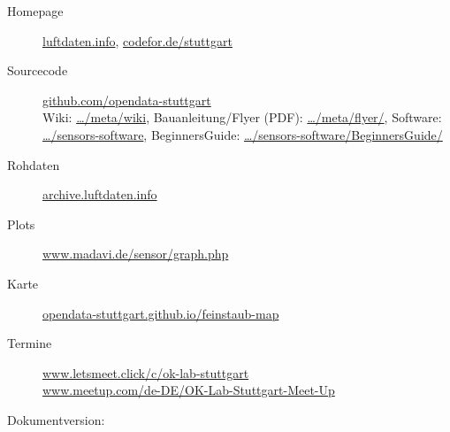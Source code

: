 \documentclass[
notumble,
]{leaflet}
\begin{document}
\begin{description}

	\item[Homepage] \href{http://luftdaten.info/}{luftdaten.info}, \href{http://codefor.de/stuttgart/}{codefor.de/stuttgart}

	\item[Sourcecode] \href{https://github.com/opendata-stuttgart/}{github.com/opendata-stuttgart}
		\\Wiki: \href{https://github.com/opendata-stuttgart/meta/wiki}{\dots/meta/wiki},
		Bauanleitung/Flyer (PDF): \href{https://github.com/opendata-stuttgart/meta/flyer/}{\dots/meta/flyer/},
		Software: \href{https://github.com/opendata-stuttgart/sensors-software}{\dots/sensors-software},
	        BeginnersGuide: \href{https://github.com/opendata-stuttgart/sensors-software/blob/master/BeginnersGuide/Guide.md}{\dots/sensors-software/BeginnersGuide/}
	\item[Rohdaten] \href{http://archive.luftdaten.info/}{archive.luftdaten.info}
	\item[Plots] \href{https://www.madavi.de/sensor/graph.php}{www.madavi.de/sensor/graph.php}
	\item[Karte] \href{https://opendata-stuttgart.github.io/feinstaub-map/}{opendata-stuttgart.github.io/feinstaub-map}
	\item[Termine] \href{https://www.letsmeet.click/c/ok-lab-stuttgart/}{www.letsmeet.click/c/ok-lab-stuttgart}
		\\\href{http://www.meetup.com/de-DE/OK-Lab-Stuttgart-Meet-Up/}{www.meetup.com/de-DE/OK-Lab-Stuttgart-Meet-Up}%
\end{description}

\vfill{}\tiny{Dokumentversion: }

% 
% 
% 
\end{document}
